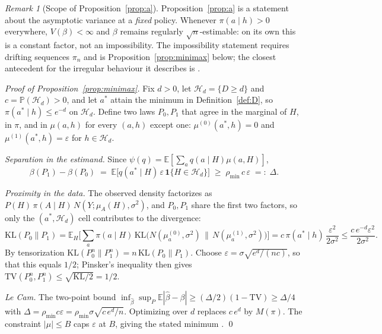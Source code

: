 \documentclass[11pt]{article}
\theoremstyle{definition}
\theoremstyle{remark}
\newtheorem{remark}{Remark}
\newcommand{\E}{\mathbb{E}}
\newcommand{\Prob}{\mathbb{P}}
\begin{document}
\begin{remark}[Scope of Proposition~\ref{prop:a}]\label{rem:notrate}
Proposition~\ref{prop:a} is a statement about the asymptotic variance at a \emph{fixed}
policy. Whenever $\pi(a \mid h) > 0$ everywhere, $V(\beta) < \infty$ and
$\beta$ remains regularly $\sqrt{n}$-estimable: on its own this is a
constant factor, not an impossibility. The impossibility statement requires
drifting sequences $\pi_n$ and is Proposition~\ref{prop:minimax} below; the
closest antecedent for the irregular behaviour it describes is
\citet{khan2010irregular}.
\end{remark}

\begin{proof}[Proof of Proposition~\ref{prop:minimax}]
Fix $d > 0$, let $\mathcal{H}_d = \{D \geq d\}$ and $c = \Prob(\mathcal{H}_d)
> 0$, and let $a^*$ attain the minimum in Definition~\ref{def:D}, so
$\pi(a^* \mid h) \leq e^{-d}$ on $\mathcal{H}_d$. Define two laws $P_0, P_1$
that agree in the marginal of $H$, in $\pi$, and in $\mu(a,h)$ for every
$(a,h)$ except one: $\mu^{(0)}(a^*,h) = 0$ and $\mu^{(1)}(a^*,h) =
\varepsilon$ for $h \in \mathcal{H}_d$.

\emph{Separation in the estimand.} Since $\psi(q) = \E[\sum_a q(a\mid H)
\mu(a,H)]$,
\[
\beta(P_1) - \beta(P_0) \;=\; \E\big[q(a^*\mid H)\,\varepsilon\,
\mathbf{1}\{H \in \mathcal{H}_d\}\big] \;\geq\; \rho_{\min}\,c\,\varepsilon
\;=:\; \Delta .
\]

\emph{Proximity in the data.} The observed density factorizes as
$P(H)\,\pi(A \mid H)\,N(Y; \mu_A(H), \sigma^2)$, and $P_0, P_1$ share the
first two factors, so only the $(a^*, \mathcal{H}_d)$ cell contributes to the
divergence:
\[
\mathrm{KL}(P_0 \| P_1) = \E_H\Big[\textstyle\sum_a \pi(a \mid H)\,
\mathrm{KL}\big(N(\mu^{(0)}_a,\sigma^2) \,\|\, N(\mu^{(1)}_a,\sigma^2)\big)
\Big] = c\,\pi(a^*\mid h)\,\frac{\varepsilon^2}{2\sigma^2}
\leq \frac{c\,e^{-d}\varepsilon^2}{2\sigma^2}.
\]
By tensorization $\mathrm{KL}(P_0^n \| P_1^n) = n\,\mathrm{KL}(P_0\|P_1)$.
Choose $\varepsilon = \sigma\sqrt{e^{d}/(nc)}$, so that this equals $1/2$;
Pinsker's inequality then gives $\mathrm{TV}(P_0^n, P_1^n) \leq
\sqrt{\mathrm{KL}/2} = 1/2$.

\emph{Le Cam.} The two-point bound
$\inf_{\hat\beta}\sup_P \E|\hat\beta - \beta| \geq (\Delta/2)(1 -
\mathrm{TV}) \geq \Delta/4$ with
$\Delta = \rho_{\min} c \varepsilon = \rho_{\min}\sigma\sqrt{c\,e^{d}/n}$.
Optimizing over $d$ replaces $c\,e^{d}$ by $M(\pi)$. The constraint
$|\mu| \leq B$ caps $\varepsilon$ at $B$, giving the stated minimum
\citep[for the two-point method see][\S2.2]{tsybakov2009introduction}. \qed
\end{proof}
\end{document}
